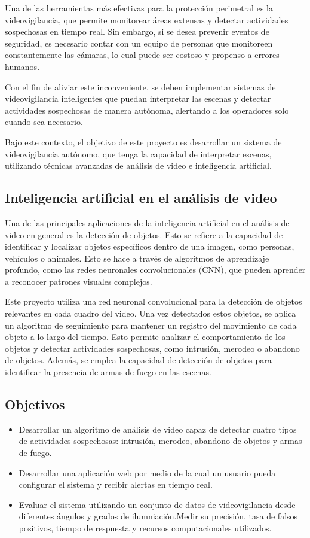 \documentclass[11pt,a4paper]{article}
\begin{document}
Una de las herramientas más efectivas para la protección perimetral es la videovigilancia, que permite monitorear áreas extensas y detectar actividades sospechosas en tiempo real. Sin embargo, si se desea prevenir eventos de seguridad, es necesario contar con un equipo de personas que monitoreen constantemente las cámaras, lo cual puede ser costoso y propenso a errores humanos.

Con el fin de aliviar este inconveniente, se deben implementar sistemas de videovigilancia inteligentes que puedan interpretar las escenas y detectar actividades sospechosas de manera autónoma, alertando a los operadores solo cuando sea necesario.

Bajo este contexto, el objetivo de este proyecto es desarrollar un sistema de videovigilancia autónomo, que tenga la capacidad de interpretar escenas, utilizando técnicas avanzadas de análisis de video e inteligencia artificial.

\subsection{Inteligencia artificial en el análisis de video}

Una de las principales aplicaciones de la inteligencia artificial en el análisis de video en general es la detección de objetos. Esto se refiere a la capacidad de identificar y localizar objetos específicos dentro de una imagen, como personas, vehículos o animales. Esto se hace a través de algoritmos de aprendizaje profundo, como las redes neuronales convolucionales (CNN), que pueden aprender a reconocer patrones visuales complejos.

Este proyecto utiliza una red neuronal convolucional para la detección de objetos relevantes en cada cuadro del video. Una vez detectados estos objetos, se aplica un algoritmo de seguimiento para mantener un registro del movimiento de cada objeto a lo largo del tiempo. Esto permite analizar el comportamiento de los objetos y detectar actividades sospechosas, como intrusión, merodeo o abandono de objetos. Además, se emplea la capacidad de detección de objetos para identificar la presencia de armas de fuego en las escenas.

\subsection{Objetivos}

\begin{itemize}
    \item Desarrollar un algoritmo de análisis de video capaz de detectar cuatro tipos de actividades sospechosas: intrusión, merodeo, abandono de objetos y armas de fuego.
    \item Desarrollar una aplicación web por medio de la cual un usuario pueda configurar el sistema y recibir alertas en tiempo real.
    \item Evaluar el sistema utilizando un conjunto de datos de videovigilancia desde diferentes ángulos y grados de ilumniación.Medir su precisión, tasa de falsos positivos, tiempo de respuesta y recursos computacionales utilizados.
\end{itemize}
\end{document}
